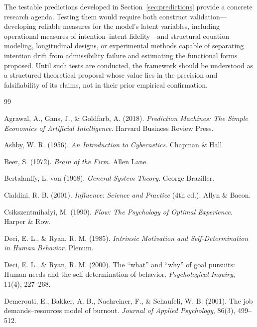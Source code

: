 \documentclass[12pt]{article}
\begin{document}
The testable predictions developed in Section~\ref{sec:predictions} provide a
concrete research agenda. Testing them would require both construct
validation---developing reliable measures for the model's latent variables,
including operational measures of intention--intent fidelity---and structural
equation modeling, longitudinal designs, or experimental methods capable of
separating intention drift from admissibility failure and estimating the
functional forms proposed. Until such tests are conducted, the framework
should be understood as a structured theoretical proposal whose value lies
in the precision and falsifiability of its claims, not in their prior
empirical confirmation.


\begin{thebibliography}{99}

Agrawal, A., Gans, J., \& Goldfarb, A. (2018).
\textit{Prediction Machines: The Simple Economics of Artificial Intelligence}.
Harvard Business Review Press.

Ashby, W. R. (1956).
\textit{An Introduction to Cybernetics}.
Chapman \& Hall.

Beer, S. (1972).
\textit{Brain of the Firm}.
Allen Lane.

Bertalanffy, L. von (1968).
\textit{General System Theory}.
George Braziller.

Cialdini, R. B. (2001).
\textit{Influence: Science and Practice} (4th ed.).
Allyn \& Bacon.

Csikszentmihalyi, M. (1990).
\textit{Flow: The Psychology of Optimal Experience}.
Harper \& Row.

Deci, E. L., \& Ryan, R. M. (1985).
\textit{Intrinsic Motivation and Self-Determination in Human Behavior}.
Plenum.

Deci, E. L., \& Ryan, R. M. (2000).
The ``what'' and ``why'' of goal pursuits: Human needs and the self-determination
of behavior.
\textit{Psychological Inquiry}, 11(4), 227--268.

Demerouti, E., Bakker, A. B., Nachreiner, F., \& Schaufeli, W. B. (2001).
The job demands--resources model of burnout.
\textit{Journal of Applied Psychology}, 86(3), 499--512.


\end{thebibliography}
\end{document}
